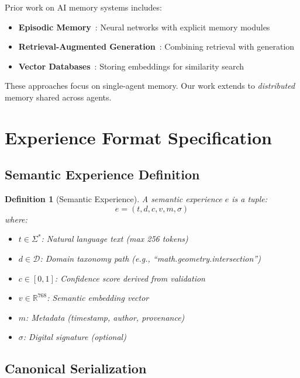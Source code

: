 \documentclass[11pt,letterpaper]{article}
\newtheorem{definition}{Definition}[section]
\begin{document}
Prior work on AI memory systems includes:

\begin{itemize}
    \item \textbf{Episodic Memory}~\cite{graves2016hybrid}: Neural networks with explicit memory modules
    \item \textbf{Retrieval-Augmented Generation}~\cite{lewis2020retrieval}: Combining retrieval with generation
    \item \textbf{Vector Databases}~\cite{pinecone2021}: Storing embeddings for similarity search
\end{itemize}

These approaches focus on single-agent memory. Our work extends to \emph{distributed} memory shared across agents.

\section{Experience Format Specification}
\label{sec:format}

\subsection{Semantic Experience Definition}

\begin{definition}[Semantic Experience]
A semantic experience $e$ is a tuple:
\begin{equation}
e = (t, d, c, v, m, \sigma)
\end{equation}
where:
\begin{itemize}
    \item $t \in \Sigma^*$: Natural language text (max 256 tokens)
    \item $d \in \mathcal{D}$: Domain taxonomy path (e.g., ``math.geometry.intersection'')
    \item $c \in [0,1]$: Confidence score derived from validation
    \item $v \in \mathbb{R}^{768}$: Semantic embedding vector
    \item $m$: Metadata (timestamp, author, provenance)
    \item $\sigma$: Digital signature (optional)
\end{itemize}
\end{definition}

\subsection{Canonical Serialization}
\end{document}

